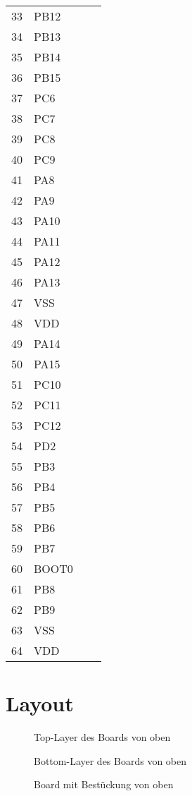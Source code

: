 \documentclass[12pt,fleqn,parskip=half,twoside,toc=index,headings=small,a4paper]{scrreprt}
\begin{document}
\begin{table}[H]
\begin{minipage}{.48\linewidth}
\begin{tabularx}{\linewidth}{@{}rllX@{}}
			\midrule
			33 	& PB12 \\
			34 	& PB13 &  \\
			35 	& PB14 &  \\
			36	& PB15 & \\
			37 	& PC6 & \\
			38 	& PC7 & \\
			39 	& PC8 & \\
			40 	& PC9 & \\
			41 	& PA8 &  \\ 
			42	& PA9 &  \\
			43	& PA10 & \\
			44  & PA11\\
			45  & PA12 & \\
			46  & PA13 & \\
			47  & VSS & \\
			48  & VDD & \\ 
			\midrule
			49  & PA14 & \\
			50  & PA15 & \\ 
			51  & PC10 & \\ 
			52  & PC11 & \\ 
			53  & PC12 & \\ 
			54  & PD2 & \\ 
			55  & PB3 & \\
			56  & PB4 & \\ 
			57  & PB5 & \\ 
			58  & PB6\\ 
			59  & PB7 & \\ 
			60  & BOOT0 \\
			61  & PB8 & \\
			62  & PB9 & \\
			63  & VSS & \\
			64  & VDD & \\ 			
			\bottomrule
		\end{tabularx}%
	\end{minipage}
\end{table}
	\section{Layout}
	\begin{figure}[h]
		\centering
		\caption{Top-Layer des Boards von oben}
	\end{figure}
	\begin{figure}[h]
		\centering
		\caption{Bottom-Layer des Boards von oben}
	\end{figure}
	\begin{figure}[h]
		\centering
		\caption{Board mit Bestückung von oben}
	\end{figure}
%
\end{document}
